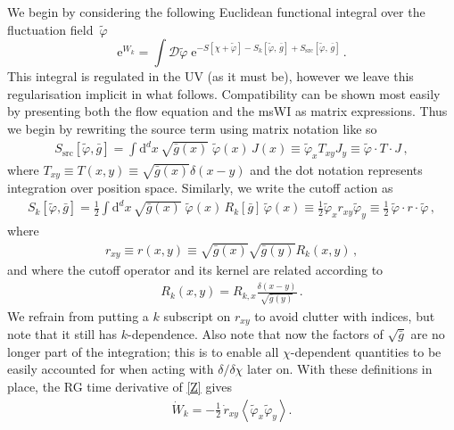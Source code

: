 \documentclass[11pt]{book} %
\numberwithin{equation}{chapter}
\begin{document}
We begin by considering the following Euclidean functional integral over the fluctuation field~$\tilde\varphi$
\begin{equation}
  \mathrm e^{W_k} = \int \mathcal{D}\tilde\varphi \;
  \mathrm e^{-S[\chi+\tilde\varphi]-S_k[\tilde\varphi,\, \bar g]
  + S_{\mathrm{src}}[\tilde\varphi, \, \bar g]} \,.
  \label{Z}
\end{equation}
This integral is regulated in the UV (as it must be), however we leave this regularisation implicit
in what follows. Compatibility can be shown most easily by presenting both the flow equation and the
msWI as matrix expressions. Thus we begin by rewriting the source term using matrix notation like so
\begin{align}
	S_\mathrm{src}[\tilde\varphi,\bar g] = \int \mathrm d^d x \, \sqrt{\bar g(x)} \;
  \tilde\varphi(x) \, J(x)
  \equiv \tilde\varphi_xT_{xy}J_y
  \equiv \tilde\varphi\cdot T\cdot J \,,
\end{align}
where $T_{xy}\equiv T(x,y)\equiv\sqrt{\bar g(x)}\delta(x-y)$ and the dot notation represents integration over position space.  Similarly, we write the cutoff action as
\begin{align}
  S_k[\tilde\varphi, \bar g] = \frac{1}{2} \int \mathrm d^d x \, \sqrt{\bar g(x)} \;
  \tilde\varphi(x) \, R_k[\bar g] \, \tilde\varphi(x)
  \equiv \frac{1}{2}\tilde\varphi_x r_{xy} \tilde\varphi_{y}
  \equiv\frac{1}{2}\,\tilde\varphi\cdot r \cdot\tilde\varphi \,,
  \label{cutoff-action}
\end{align}
where
\begin{align}
  r_{xy}\equiv r(x,y)\equiv\sqrt{\bar g(x)}\sqrt{\bar g(y)}R_{k}(x,y)\,,
  \label{odd-r}
\end{align}
and where the cutoff operator and its kernel are related according to
\begin{align}
	R_k(x,y) = R_{k,x}\frac{\delta(x-y)}{\sqrt{\bar g(y)}} \,.
\end{align}
We refrain from putting a $k$ subscript on $r_{xy}$ to avoid clutter with indices,
but note that it still has $k$-dependence. Also note that now the factors of $\sqrt{\bar g}$ are no
longer part of the integration; this is to enable all $\chi$-dependent quantities to be easily accounted
for when acting with $\delta/\delta\chi$ later on.
With these definitions in place, the RG time derivative of \eqref{Z} gives
\begin{align}
	\dot W_k = -\frac{1}{2} \, \dot r_{xy} \left<\tilde\varphi_x \tilde\varphi_y \right>.
	\label{W_flow}
\end{align}
\end{document}
